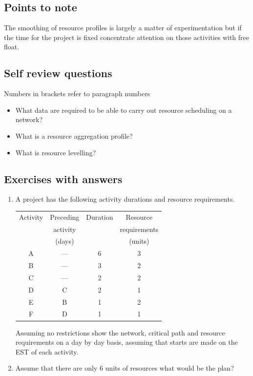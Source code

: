\documentclass[]{report}
\begin{document}
	\subsection*{Points to note} 
The smoothing of resource profiles is largely a matter of experimentation but if the time for the project is fixed concentrate attention on those activities with free float. %

\subsection*{Self review questions} 
Numbers in brackets refer to paragraph numbers 
\begin{itemize}
	\item What data are required to be able to carry out resource scheduling on a network? 
	\item  What is a resource aggregation profile? 
	\item  What is resource levelling? 
\end{itemize}

	\subsection*{Exercises with answers}
\begin{enumerate}
	\item A project has the following activity durations and resource requirements. 

\begin{center}
\begin{tabular}{|c|c|c|c|}
Activity & Preceding  & Duration & Resource \\
& activity & & requirements \\
&	(days)&& (units) \\ \hline
	A & — & 6 & 3  \\ \hline
	B & — & 3 & 2  \\ \hline
	C & — & 2 & 2  \\ \hline
	D & C & 2 & 1 \\ \hline
	E & B & 1 & 2 \\ \hline
	F & D & 1 & 1 \\ \hline
\end{tabular}
\end{center}	
	Assuming no restrictions show the network, critical path and resource requirements on a 
	day by day basis, assuming that starts are made on the EST of each activity. 
\item Assume that there are only 6 units of resources what would be the plan? 
\end{enumerate}
\newpage	
\end{document}
